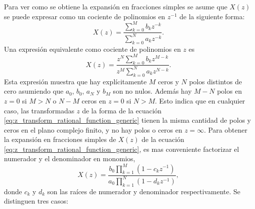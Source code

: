 \documentclass[a4paper]{report}
\begin{document}
Para ver como se obtiene la expansión en fracciones simples se asume que \(X(z)\) se puede expresar como un cociente de polinomios en \(z^{-1}\) de la siguiente forma:
\begin{equation}\label{eq:z_transform_rational_function_generic}
 X(z)=\dfrac{\sum\limits_{k=0}^Mb_kz^{-k}}{\sum\limits_{k=0}^Na_kz^{-k}}. 
\end{equation}
Una expresión equivalente como cociente de polinomios en \(z\) es
\[
 X(z)=\dfrac{z^N\sum\limits_{k=0}^Mb_kz^{M-k}}{z^M\sum\limits_{k=0}^Na_kz^{N-k}}.
\]
Esta expresión muestra que hay explícitamente \(M\) ceros y \(N\) polos distintos de cero asumiendo que \(a_0\), \(b_0\), \(a_N\) y \(b_M\) son no nulos. Además hay \(M-N\) polos en \(z=0\) si \(M>N\) o \(N-M\) ceros en \(z=0\) si \(N>M\). Esto indica que en cualquier caso, las transformadas \(z\) de la forma de la ecuación \ref{eq:z_transform_rational_function_generic} tienen la misma cantidad de polos y ceros en el plano complejo finito, y no hay polos o ceros en \(z=\infty\). Para obtener la expansión en fracciones simples de \(X(z)\) de la ecuación \ref{eq:z_transform_rational_function_generic}, es mas conveniente factorizar el numerador y el denominador en monomios,
\begin{equation}\label{eq:z_transform_rational_function_factorized}
 X(z)=\frac{b_0\prod\limits_{k=1}^M(1-c_kz^{-1})}{a_0\prod\limits_{k=1}^N(1-d_kz^{-1})}, 
\end{equation}
donde \(c_k\) y \(d_k\) son las raíces de numerador y denominador respectivamente. Se distinguen tres casos:
\end{document}
